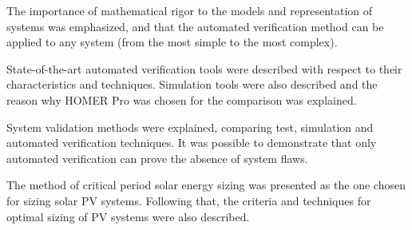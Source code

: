 The importance of mathematical rigor to the models and representation of systems was emphasized, and that the automated verification method can be applied to any system (from the most simple to the most complex).

State-of-the-art automated verification tools were described with respect to their characteristics and techniques. Simulation tools were also described and the reason why HOMER Pro was chosen for the comparison was explained.

System validation methods were explained, comparing test, simulation and automated verification techniques. It was possible to demonstrate that only automated verification can prove the absence of system flaws.

The method of critical period solar energy sizing was presented as the one chosen for sizing solar PV systems. Following that, the criteria and techniques for optimal sizing of PV systems were also described.

